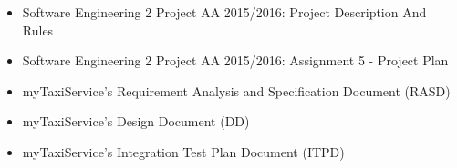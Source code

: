 \begin{itemize}
	\item Software Engineering 2 Project AA 2015/2016: Project Description And Rules
	\item Software Engineering 2 Project AA 2015/2016: Assignment 5 - Project Plan
	\item myTaxiService's Requirement Analysis and Specification Document (RASD)
	\item myTaxiService's Design Document (DD)
	\item myTaxiService's Integration Test Plan Document (ITPD)
\end{itemize}
